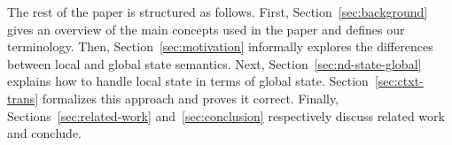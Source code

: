 \documentclass{jfp}
\begin{document}
The rest of the paper is structured as follows.
First, Section~\ref{sec:background} gives an overview of the main concepts
  used in the paper and defines our terminology. Then,
Section~\ref{sec:motivation} informally explores the differences
  between local and global state semantics. Next,
Section~\ref{sec:nd-state-global}  explains how to handle local state
in terms of global state.
Section~\ref{sec:ctxt-trans} formalizes this approach and proves it correct.
Finally, Sections~\ref{sec:related-work} and~\ref{sec:conclusion} respectively
discuss related work and conclude.


%
%
%
\end{document}
